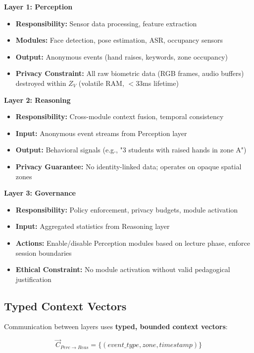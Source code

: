 \documentclass[conference]{IEEEtran}
\begin{document}
\textbf{Layer 1: Perception}
\begin{itemize}
    \item \textbf{Responsibility:} Sensor data processing, feature extraction
    \item \textbf{Modules:} Face detection, pose estimation, ASR, occupancy sensors
    \item \textbf{Output:} Anonymous events (hand raises, keywords, zone occupancy)
    \item \textbf{Privacy Constraint:} All raw biometric data (RGB frames, audio buffers) destroyed within $Z_V$ (volatile RAM, $<$33ms lifetime)
\end{itemize}

\textbf{Layer 2: Reasoning}
\begin{itemize}
    \item \textbf{Responsibility:} Cross-module context fusion, temporal consistency
    \item \textbf{Input:} Anonymous event streams from Perception layer
    \item \textbf{Output:} Behavioral signals (e.g., "3 students with raised hands in zone A")
    \item \textbf{Privacy Guarantee:} No identity-linked data; operates on opaque spatial zones
\end{itemize}

\textbf{Layer 3: Governance}
\begin{itemize}
    \item \textbf{Responsibility:} Policy enforcement, privacy budgets, module activation
    \item \textbf{Input:} Aggregated statistics from Reasoning layer
    \item \textbf{Actions:} Enable/disable Perception modules based on lecture phase, enforce session boundaries
    \item \textbf{Ethical Constraint:} No module activation without valid pedagogical justification
\end{itemize}

\subsection{Typed Context Vectors}
Communication between layers uses \textbf{typed, bounded context vectors}:

\begin{equation}
\vec{C}_{Perc \to Reas} = \{(event\_type, zone, timestamp)\}
\end{equation}
\end{document}
